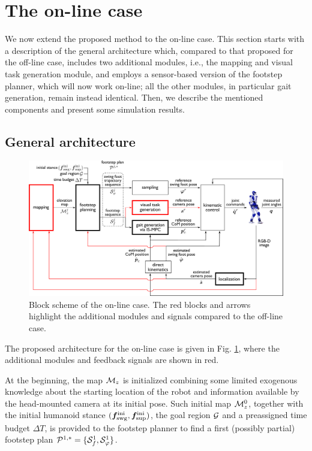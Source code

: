 \section{The on-line case} 
\label{sec:WoS:onlineCase}

We now extend the proposed method to the on-line case.
This section starts with a description of the general architecture which, compared to that proposed for the off-line case, includes two additional modules, i.e., the mapping and visual task generation module, and employs a sensor-based version of the footstep planner, which will now work on-line; all the other modules, in particular gait generation, remain instead identical.  
Then, we describe the mentioned components and present some simulation results.

\subsection{General architecture}
\label{sec:WoS:onlineCase:GeneralArchitecture}
\begin{figure}
\centering
\includegraphics[width=\textwidth]{figures/BlockSchemeOnline.pdf}
\caption{Block scheme of the on-line case. The red blocks and arrows highlight the additional modules and signals compared to the off-line case.}
\label{fig:WoS:blockScheme2}
\end{figure}

The proposed architecture for the on-line case is given in Fig. \ref{fig:WoS:blockScheme2}, where the additional modules and feedback signals are shown in red.

At the beginning, the map ${\cal M}_z$ is initialized combining some limited exogenous knowledge about the starting location of the robot and information available by the head-mounted camera at its initial pose. Such initial map ${\cal M}_z^0$, together with the initial humanoid stance $({\bm{f}}_{\rm swg}^{\rm ini}, {\bm{f}}_{\rm sup}^{\rm ini})$, the goal region $\cal G$ and a preassigned time budget $\Delta T$, is provided to the footstep planner to find a first (possibly partial) footstep plan ${\cal P}^{1,*} = \{ {\cal S}_f^{1}, {\cal S}_\varphi^{1} \}$.

